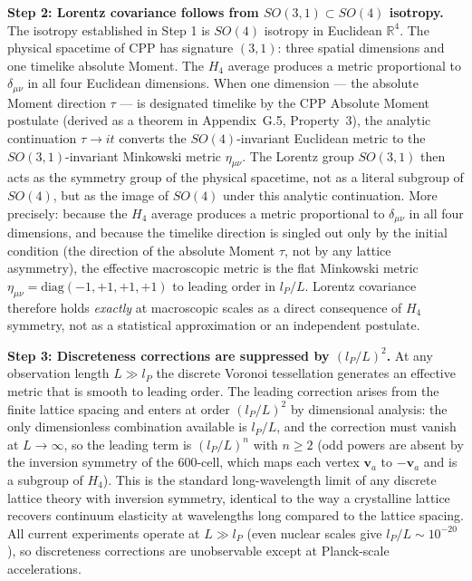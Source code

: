 \documentclass[11pt,letterpaper]{article}
\begin{document}
\textbf{Step 2: Lorentz covariance follows from $SO(3,1) \subset SO(4)$ 
isotropy.}
The isotropy established in Step 1 is $SO(4)$ isotropy in Euclidean $\mathbb{R}^4$. The physical spacetime of CPP has signature $(3,1)$: three 
spatial dimensions and one timelike absolute Moment. The $H_4$ average produces a metric proportional to $\delta_{\mu\nu}$ 
in all four Euclidean dimensions. When one dimension — the absolute 
Moment direction $\tau$ — is designated timelike by the CPP Absolute 
Moment postulate (derived as a theorem in Appendix~G.5, Property~3), 
the analytic continuation $\tau \to it$ converts the $SO(4)$-invariant 
Euclidean metric to the $SO(3,1)$-invariant Minkowski metric 
$\eta_{\mu\nu}$. The Lorentz group $SO(3,1)$ then acts as the symmetry 
group of the physical spacetime, not as a literal subgroup of $SO(4)$, 
but as the image of $SO(4)$ under this analytic continuation. 
More precisely: because the $H_4$ average produces a metric proportional to $\delta_{\mu\nu}$ in all four dimensions, and because the timelike direction is 
singled out only by the initial condition (the direction of the absolute Moment $\tau$, not by any lattice asymmetry), the effective macroscopic metric is the flat Minkowski metric $\eta_{\mu\nu} = \text{diag}(-1,+1,+1,+1)$ to leading order in $l_P/L$. Lorentz covariance therefore holds \emph{exactly} at 
macroscopic scales as a direct consequence of $H_4$ symmetry, not as a statistical approximation or an independent postulate.

\textbf{Step 3: Discreteness corrections are suppressed by $(l_P/L)^2$.}
At any observation length $L \gg l_P$ the discrete Voronoi tessellation generates an effective metric that is smooth to leading order. The leading 
correction arises from the finite lattice spacing and enters at order $(l_P/L)^2$ by dimensional analysis: the only dimensionless combination 
available is $l_P/L$, and the correction must vanish at $L \to \infty$, so the leading term is $(l_P/L)^n$ with $n \geq 2$ (odd powers are absent by the 
inversion symmetry of the 600-cell, which maps each vertex $\mathbf{v}_a$ to $-\mathbf{v}_a$ and is a subgroup of $H_4$). This is the standard 
long-wavelength limit of any discrete lattice theory with inversion symmetry, identical to the way a crystalline lattice recovers continuum elasticity at 
wavelengths long compared to the lattice spacing. All current experiments operate at $L \gg l_P$ (even nuclear scales give $l_P/L \sim 10^{-20}$), so 
discreteness corrections are unobservable except at Planck-scale accelerations.
\end{document}
